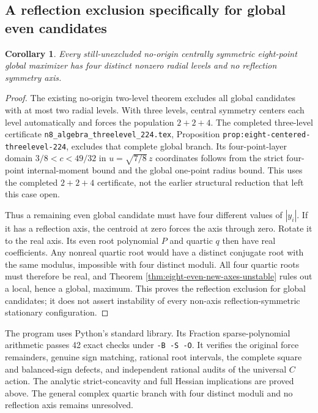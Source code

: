 \documentclass[11pt,a4paper]{article}
\newtheorem{corollary}[theorem]{Corollary}
\theoremstyle{remark}
\begin{document}
\subsection{A reflection exclusion specifically for global even candidates}
\begin{corollary}\label{cor:eight-even-new-no-reflection-global}
Every still-unexcluded no-origin centrally symmetric eight-point
global maximizer has four distinct nonzero radial levels and no
reflection symmetry axis.
\end{corollary}
\begin{proof}
The existing no-origin two-level theorem excludes all global candidates
with at most two radial levels. With three levels, central symmetry
centers each level automatically and forces the population $2+2+4$.
The completed three-level certificate
\texttt{n8\_algebra\_threelevel\_224.tex}, Proposition
\texttt{prop:eight-centered-threelevel-224}, excludes that complete
global branch. Its four-point-layer domain $3/8<c<49/32$ in
$u=\sqrt{7/8}\,z$ coordinates follows from the strict four-point
internal-moment bound and the global one-point radius bound.
This uses the completed $2+2+4$ certificate, not the earlier
structural reduction that left this case open.

Thus a remaining even global candidate must have four different
values of $|y_i|$. If it has a reflection axis, the centroid at zero
forces the axis through zero. Rotate it to the real axis. Its even
root polynomial $P$ and quartic $q$ then have real coefficients.
Any nonreal quartic root would have a distinct conjugate root with
the same modulus, impossible with four distinct moduli. All four
quartic roots must therefore be real, and Theorem
\ref{thm:eight-even-new-axes-unstable} rules out a local, hence a
global, maximum. This proves the reflection exclusion for global
candidates; it does not assert instability of every non-axis
reflection-symmetric stationary configuration.
\end{proof}

The program  uses Python's standard library.
Its Fraction sparse-polynomial arithmetic passes
42 exact checks under \texttt{-B -S -O}. It verifies the original
force remainders, genuine sign matching, rational root intervals,
the complete square and balanced-sign defects, and independent
rational audits of the universal $C$ action.
The analytic strict-concavity and full Hessian implications are
proved above. The general complex quartic branch with four distinct
moduli and no reflection axis remains unresolved.
\end{document}
